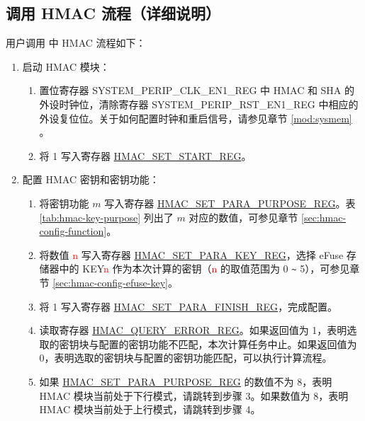 \documentclass[main\_\_CN.tex]{subfiles}
\begin{document}
\subsection{调用 HMAC 流程（详细说明）}
\label{sec:hmac-process-detailed}
用户调用 \chipname{} 中 HMAC 流程如下：

\begin{enumerate}
    \item 启动 HMAC 模块：
    \begin{enumerate}
        \item 置位寄存器 SYSTEM\_PERIP\_CLK\_EN1\_REG 中 HMAC 和 SHA 的外设时钟位，清除寄存器 SYSTEM\_PERIP\_RST\_EN1\_REG 中相应的外设复位位。关于如何配置时钟和重启信号，请参见章节 \ref{mod:sysmem} \textit{}。
        \item 将 1 写入寄存器 \hyperref[regdesc:HMACSETSTARTREG]{HMAC\_SET\_START\_REG}。
    \end{enumerate}

    \item 配置 HMAC 密钥和密钥功能：
        \begin{enumerate}
            \item 将密钥功能 \begin{math}m\end{math} 写入寄存器 \hyperref[regdesc:HMACSETPARAPURPOSEREG]{HMAC\_SET\_PARA\_PURPOSE\_REG}。表 \ref{tab:hmac-key-purpose} 列出了 \begin{math}m\end{math} 对应的数值，可参见章节 \ref{sec:hmac-config-function}。
            \item 将数值 \textcolor{red}{n} 写入寄存器 \hyperref[regdesc:HMACSETPARAKEYREG]{HMAC\_SET\_PARA\_KEY\_REG}，选择 eFuse 存储器中的 KEY\textcolor{red}{n} 作为本次计算的密钥（\textcolor{red}{n} 的取值范围为 0 \verb+~+ 5），可参见章节 \ref{sec:hmac-config-efuse-key}。
            \item 将 1 写入寄存器 \hyperref[regdesc:HMACSETPARAFINISHREG]{HMAC\_SET\_PARA\_FINISH\_REG}，完成配置。
            \item 读取寄存器 \hyperref[regdesc:HMACQUERYERRORREG]{HMAC\_QUERY\_ERROR\_REG}。如果返回值为 1，表明选取的密钥块与配置的密钥功能不匹配，本次计算任务中止。如果返回值为 0，表明选取的密钥块与配置的密钥功能匹配，可以执行计算流程。
            \item 如果 \hyperref[regdesc:HMACSETPARAPURPOSEREG]{HMAC\_SET\_PARA\_PURPOSE\_REG} 的数值不为 8，表明 HMAC 模块当前处于下行模式，请跳转到步骤 3。如果数值为 8，表明 HMAC 模块当前处于上行模式，请跳转到步骤 4。
        \end{enumerate}


\end{enumerate}
\end{document}
